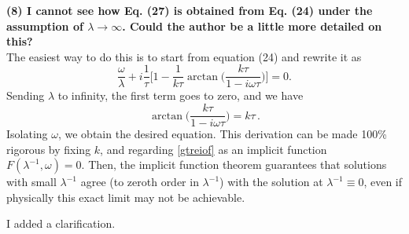 \documentclass[PRD,onecolumn, nofootinbib]{revtex4-1}
\begin{document}
{\bf (8) I cannot see how Eq. (27) is obtained from Eq. (24) under the assumption of
$\lambda\to\infty$. Could the author be a little more detailed on this?}\\

The easiest way to do this is to start from equation (24) and rewrite it as
\begin{equation}\label{gtreiof}
 \dfrac{\omega}{\lambda}+i \dfrac{1}{\tau} \bigg[ 1-\dfrac{1}{k\tau}\arctan\bigg(\dfrac{k\tau}{1{-}i\omega \tau}\bigg) \bigg]=0.
\end{equation}
Sending $\lambda$ to infinity, the first term goes to zero, and we have
\begin{equation}
\arctan\bigg(\dfrac{k\tau}{1{-}i\omega \tau}\bigg)=k\tau \, .
\end{equation}
Isolating $\omega$, we obtain the desired equation. This derivation can be made 100\% rigorous by fixing $k$, and regarding \eqref{gtreiof} as an implicit function $F(\lambda^{-1},\omega)=0$. Then, the implicit function theorem guarantees that solutions with small $\lambda^{-1}$ agree (to zeroth order in $\lambda^{-1}$) with the solution at $\lambda^{-1}\equiv 0$, even if physically this exact limit may not be achievable.

I added a clarification.



\newpage

 
\end{document}
